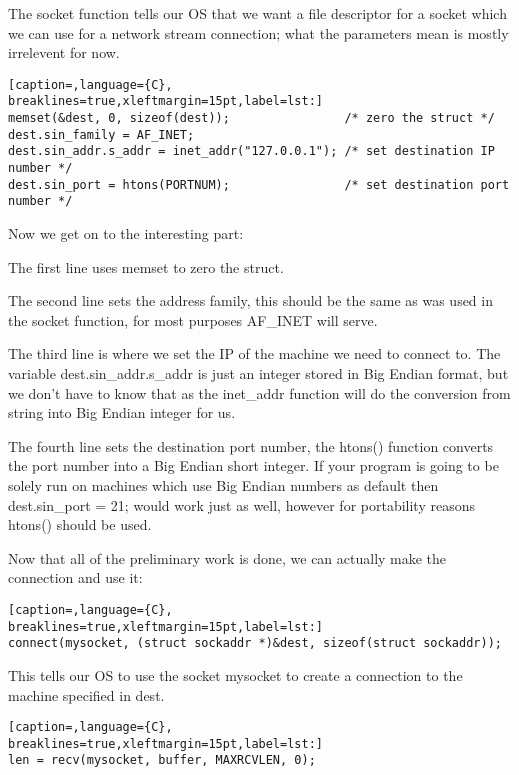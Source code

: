 The socket function tells our OS that we want a file descriptor for a socket
which we can use for a network stream connection; what the parameters mean is
mostly irrelevent for now.
\lstset{basicstyle=\scriptsize, numbers=left, captionpos=b, tabsize=4}
\begin{lstlisting}[caption=,language={C},
breaklines=true,xleftmargin=15pt,label=lst:]
memset(&dest, 0, sizeof(dest));                /* zero the struct */
dest.sin_family = AF_INET;
dest.sin_addr.s_addr = inet_addr("127.0.0.1"); /* set destination IP number */ 
dest.sin_port = htons(PORTNUM);                /* set destination port number */
\end{lstlisting}

Now we get on to the interesting part:

The first line uses memset to zero the struct.

The second line sets the address family, this should be the same as was used in
the socket function, for most purposes AF\_INET will serve.

The third line is where we set the IP of the machine we need to connect to. The
variable dest.sin\_addr.s\_addr is just an integer stored in Big Endian format,
but we don't have to know that as the inet\_addr function will do the
conversion from string into Big Endian integer for us.

The fourth line sets the destination port number, the htons() function converts
the port number into a Big Endian short integer. If your program is going to be
solely run on machines which use Big Endian numbers as default then
dest.sin\_port = 21; would work just as well, however for portability reasons
htons() should be used.

Now that all of the preliminary work is done, we can actually make the
connection and use it:
\lstset{basicstyle=\scriptsize, numbers=left, captionpos=b, tabsize=4}
\begin{lstlisting}[caption=,language={C},
breaklines=true,xleftmargin=15pt,label=lst:]
connect(mysocket, (struct sockaddr *)&dest, sizeof(struct sockaddr));
\end{lstlisting}

This tells our OS to use the socket mysocket to create a connection to the
machine specified in dest.
\lstset{basicstyle=\scriptsize, numbers=left, captionpos=b, tabsize=4}
\begin{lstlisting}[caption=,language={C},
breaklines=true,xleftmargin=15pt,label=lst:]
len = recv(mysocket, buffer, MAXRCVLEN, 0);
\end{lstlisting}

